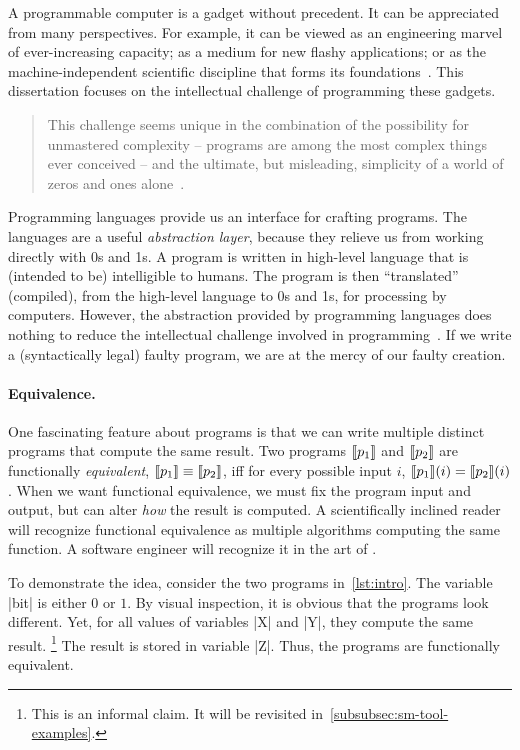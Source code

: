 A programmable computer is a gadget without precedent.
It can be appreciated from many perspectives.
For example, it can be viewed as an engineering marvel of ever-increasing capacity;
as a medium for new flashy applications;
or as the machine-independent scientific discipline that forms its foundations~\cite{dijkstra1979a,hoare2006}.
This dissertation focuses on the intellectual challenge of {programming} these gadgets.

\begin{quotation}
\noindent This challenge seems unique in the combination of the possibility for
unmastered complexity -- programs are among the most complex things ever
conceived -- and the ultimate, but misleading, simplicity of a world of zeros
and ones alone~\cite{dijkstra1979a}.
\end{quotation}

Programming languages provide us an interface for crafting programs.
The languages are a useful \emph{abstraction layer}, because they relieve us from working directly with 0s and 1s.
A program is written in {high-level} language that is (intended to be) intelligible to humans.
The program is then \enquote{translated} (compiled), from the high-level language to 0s and 1s, for processing by computers.
However, the abstraction provided by programming languages does nothing to reduce the intellectual challenge involved in programming~\cite{dijkstra1979b}.
If we write a (syntactically legal) faulty program, we are at the mercy of our faulty creation.

\paragraph{Equivalence.}
One fascinating feature about programs is that we can write multiple distinct programs that compute the same result.
Two programs $\llbracket p_1\rrbracket$ and $\llbracket p_2\rrbracket$ are functionally \emph{equivalent}, \ie \(\llbracket p_1\rrbracket \equiv \llbracket p_2\rrbracket\), iff for every possible input \(i\), \(\llbracket p_1\rrbracket(i) = \llbracket p_2\rrbracket(i)\).
When we want functional equivalence, we must fix the program input and output, but can alter \emph{how} the result is computed.
A scientifically inclined reader will recognize functional equivalence as multiple algorithms computing the same function.
A software engineer will recognize it in the art of .

To demonstrate the idea, consider the two programs in~\autoref{lst:intro}.
The variable \pr|bit| is either \(0\) or \(1\).
By visual inspection, it is obvious that the programs look different.
Yet, for all values of variables \pr|X| and \pr|Y|, they compute the same result.%
\footnote{This is an informal claim. It will be revisited in~\autoref{subsubsec:sm-tool-examples}.}
The result is stored in variable \pr|Z|.
Thus, the programs are functionally equivalent.


